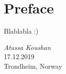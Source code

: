 \chapter{Preface}

Blablabla :)


\medskip
\begin {flushright}
  \textit{Atussa Koushan} \\
  \textsc {17.12.2019} \\
  Trondheim, Norway
\end {flushright}



\makeatletter
{}


\makeatother




